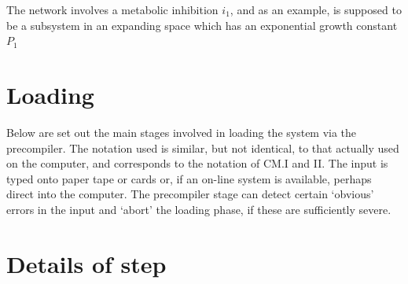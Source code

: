 The network involves a metabolic inhibition $i_1$, and as an example, is supposed to be a subsystem in an expanding space which has an exponential growth constant $P_{1}$

\section{Loading}

Below are set out the main stages involved in loading the system via the precompiler. The notation used is similar, but not identical, to that actually used on the computer, and corresponds to the notation of CM.I and II. The input is typed onto paper tape or cards or, if an on-line system is available, perhaps direct into the computer. The precompiler stage can detect certain `obvious' errors in the input and `abort' the loading phase, if these are sufficiently severe.

\section{Details of step}

